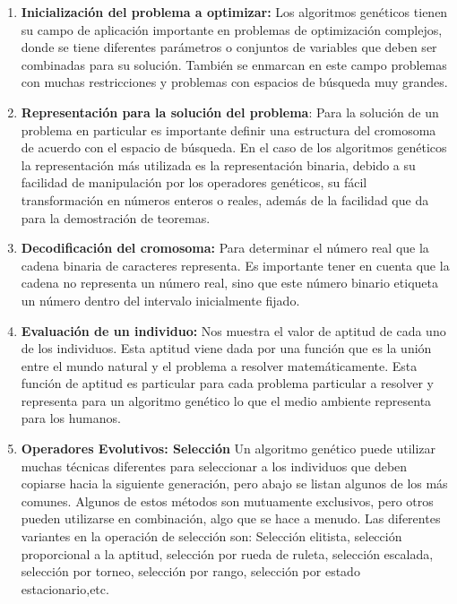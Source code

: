 \documentclass{article}
\begin{document}
\begin{enumerate}
    \item \textbf{Inicializaci\'on del problema a optimizar:} Los algoritmos genéticos tienen su campo de aplicación importante en problemas de
    optimización complejos, donde se tiene diferentes parámetros o conjuntos de variables
    que deben ser combinadas para su solución. También se enmarcan en este campo
    problemas con muchas restricciones y problemas con espacios de búsqueda muy
    grandes.\\

    \item \textbf{Representación para la solución del problema}: Para la solución de un problema en particular es importante definir una estructura del
    cromosoma de acuerdo con el espacio de búsqueda. En el caso de los algoritmos
    genéticos la representación más utilizada es la representación binaria, debido a su
    facilidad de manipulación por los operadores genéticos, su fácil transformación en
    números enteros o reales, además de la facilidad que da para la demostración de
    teoremas. \\ 
    
    \item \textbf{Decodificación del cromosoma:} Para determinar el número real que la cadena binaria de caracteres representa. Es importante tener en cuenta que la cadena no representa un número real, sino que este número binario etiqueta un número dentro del intervalo inicialmente fijado. \\
    
    \item \textbf{Evaluación de un individuo:} Nos muestra el valor de aptitud de cada uno de los individuos. Esta aptitud viene dada por una función que es la unión entre el mundo natural y el problema a resolver matemáticamente. Esta función de aptitud es particular para cada problema particular a resolver y representa para un algoritmo genético lo que el medio ambiente representa para los humanos.\\
    
    \item \textbf{Operadores Evolutivos: Selección} Un algoritmo genético puede utilizar muchas técnicas diferentes para seleccionar a los individuos que deben copiarse hacia la siguiente generación, pero abajo se listan algunos de los más comunes. Algunos de estos métodos son mutuamente exclusivos, pero otros pueden utilizarse en combinación, algo que se hace a menudo. Las diferentes variantes en la operación de selección son: Selección elitista, selección proporcional a la aptitud, selección por rueda de ruleta, selección escalada, selección por torneo, selección por rango, selección por estado estacionario,etc.\\
    

\end{enumerate}
\end{document}
